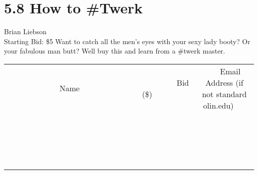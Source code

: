 \documentclass[11pt]{article}
\begin{document}
\section*{5.8 How to \#Twerk}
Brian Liebson
\\
Starting Bid: \$5
\newline
Want to catch all the men's eyes with your sexy lady booty? Or your fabulous man butt? Well buy this and learn from a \#twerk master.
\\[3ex]
\begin{tabular}{c c c}
~~~~~~~~~~~~~Name~~~~~~~~~~~~~ & ~~~~~~~~~Bid (\$)~~~~~~~~~  & ~~~Email Address (if not standard olin.edu)~~~\\
 & & \\
\hline
 & & \\
\hline
 & & \\
\hline
 & & \\
\hline
 & & \\
\hline
 & & \\
\hline
 & & \\
\hline
 & & \\
\hline
 & & \\
\hline
 & & \\
\hline
 & & \\
\hline
 & & \\
\hline
 & & \\
\hline
 & & \\
\hline
 & & \\
\hline
 & & \\
\hline
 & & \\
\hline
 & & \\
\hline
 & & \\
\hline
\end{tabular}
\newpage
\end{document}
